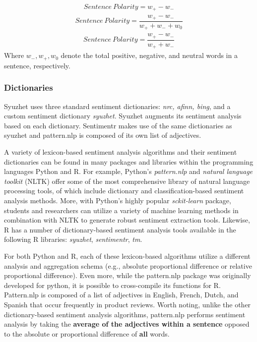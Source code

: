 \begin{align}
Sentence \ Polarity = w_+ - w_-
\end{align}
\begin{align}
Sentence \ Polarity = \dfrac{w_+ - w_-}{w_+ + w_- + w_0}
\end{align}
\begin{align}
Sentence \ Polarity = \dfrac{w_+ - w_-}{w_+ + w_-}
\end{align}
Where $w_-, w_+, w_0$ denote the total positive, negative, and neutral words in a sentence, respectively.

\subsubsection{Dictionaries}
Syuzhet uses three standard sentiment dictionaries: \textit{nrc, afinn, bing}, and a custom sentiment dictionary \textit{syuzhet}. Syuzhet augments its sentiment analysis based on each dictionary. Sentimentr makes use of the same dictionaries as syuzhet and pattern.nlp is composed of its own list of adjectives.

A variety of lexicon-based sentiment analysis algorithms and their sentiment dictionaries can be found in many packages and libraries within the programming languages Python and R. For example, Python's \textit{pattern.nlp} and \textit{natural language toolkit} (NLTK) offer some of the most comprehensive library of natural language processing tools, of which include dictionary and classification-based sentiment analysis methods. More, with Python's highly popular \textit{sckit-learn} package, students and researchers can utilize a variety of machine learning methods in combination with NLTK to generate robust sentiment extraction tools. Likewise, R has a number of dictionary-based sentiment analysis tools available in the following R libraries: \textit{syuzhet}, \textit{sentimentr}, \textit{tm}. 

For both Python and R, each of these lexicon-based algorithms utilize a different analysis and aggregation schema (e.g., absolute proportional difference or relative proportional difference). Even more, while the pattern.nlp package was originally developed for python, it is possible to cross-compile its functions for R. Pattern.nlp is composed of a list of adjectives in English, French, Dutch, and Spanish that occur frequently in product reviews. Worth noting, unlike the other dictionary-based sentiment analysis algorithms, pattern.nlp performs sentiment analysis by taking the \textbf{average of the adjectives within a sentence} opposed to the absolute or proportional difference of \textbf{all} words. 

